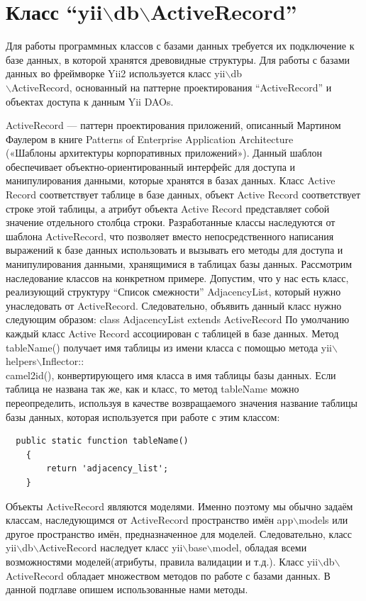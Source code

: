 \documentclass[a4paper,14pt]{extreport}
\theoremstyle{definition}
\begin{document}
\section{Класс “yii$\backslash$db$\backslash$ActiveRecord”}
Для работы программных классов с базами данных требуется их подключение к базе данных,
в которой хранятся древовидные структуры. Для работы с базами данных во фреймворке Yii2
используется класс yii$\backslash$db \\ $\backslash$ActiveRecord, основанный на паттерне проектирования “ActiveRecord”
и объектах доступа к данным Yii DAOs.

ActiveRecord — паттерн проектирования приложений, описанный Мартином Фаулером в книге Patterns of Enterprise Application Architecture \\ («Шаблоны архитектуры корпоративных приложений»)\cite{Fowler1,Fowler2}. Данный шаблон обеспечивает объектно-ориентированный интерфейс для доступа и манипулирования данными, которые хранятся в базах данных. Класс Active Record соответствует таблице в базе данных, объект Active Record соответствует строке этой таблицы, а атрибут объекта Active Record представляет собой значение отдельного столбца строки.
Разработанные классы наследуются от шаблона ActiveRecord, что позволяет вместо непосредственного написания выражений к базе данных использовать и вызывать его методы для доступа и манипулирования данными, хранящимися в таблицах базы данных.
Рассмотрим наследование классов на конкретном примере. Допустим, что у нас есть класс, реализующий структуру “Список смежности” AdjacencyList, который нужно унаследовать от ActiveRecord.  Следовательно, объявить данный класс нужно следующим образом:
class AdjacencyList extends ActiveRecord
По умолчанию каждый класс Active Record ассоциирован с таблицей в базе данных. Метод tableName() получает имя таблицы из имени класса с помощью метода yii$\backslash$helpers$\backslash$Inflector::\\camel2id(), конвертирующего имя класса в имя таблицы базы данных. Если таблица не названа так же, как и класс, то метод tableName можно переопределить, используя в качестве возвращаемого значения название таблицы базы данных, которая используется при работе с этим классом:
  \begin{verbatim}
  public static function tableName()
    {
        return 'adjacency_list';
    }
    \end{verbatim}
Объекты ActiveRecord являются моделями. Именно поэтому мы обычно задаём классам, наследующимся от ActiveRecord пространство имён app$\backslash$models или другое пространство имён, предназначенное для моделей. Следовательно, класс yii$\backslash$db$\backslash$ActiveRecord наследует класс yii$\backslash$base$\backslash$model, обладая всеми возможностями моделей(атрибуты, правила валидации и т.д.).
Класс yii$\backslash$db$\backslash$ActiveRecord обладает множеством методов по работе с базами данных. В данной подглаве опишем использованные нами методы.
\end{document}
